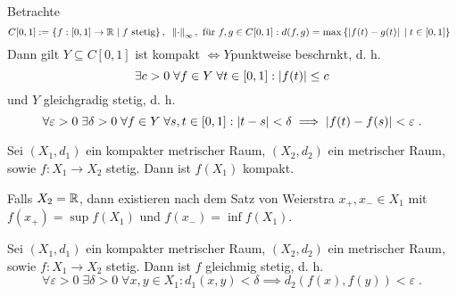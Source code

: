 	 \begin{ex}
	 	Betrachte 
	 	\[C[0,1] := \left\{f:[0,1] \to \mathbb{R} \;\vert\; f\text{ stetig}\right\}, \;\; \left\lVert\cdot\right\rVert_\infty , \text{ f{\"u}r } f, g \in C[0,1]: d(f,g) = \max \left\{\left\lvert f(t)- g(t) \right\rvert\;\vert\; t\in[0,1]\right\}\;\;\]
	 	Dann gilt $Y\subseteq C[0,1]$ ist kompakt $\iff Y$punktweise beschr\as nkt, d. h. 
	 	\[\exists c>0 \;\forall f \in Y \;\forall t \in [0,1]: \left\lvert f(t) \right\rvert \leq c\]
	 	und $Y$ gleichgradig stetig, d. h. 
	 	\[\forall \varepsilon > 0\; \exists \delta > 0 \;\forall f \in Y\;\forall s, t \in [0,1]: \left\lvert t-s \right\rvert < \delta \implies \left\lvert f(t) - f(s) \right\rvert < \varepsilon \;.\]
	 \end{ex} 
	 
	 \begin{theorem}
	 	Sei \((X_1, d_1)\) ein kompakter metrischer Raum, \((X_2, d_2)\) ein metrischer Raum, sowie \(f:X_1 \to X_2\) stetig. Dann ist \(f(X_1)\) kompakt.
	 \end{theorem}
	 \begin{rem}
	 	Falls $X_2 = \mathbb{R}$, dann existieren nach dem Satz von Weierstra\s{} \(x_+, x_- \in X_1\) mit \(f(x_+) = \sup f(X_1)\) und \(f(x_-) = \inf f(X_1)\).
	 \end{rem}
	 
	 \begin{theorem}
	 		Sei \((X_1, d_1)\) ein kompakter metrischer Raum, \((X_2, d_2)\) ein metrischer Raum, sowie \(f:X_1 \to X_2\) stetig. Dann ist $f$ gleichm\as \s ig stetig, d. h. 
	 		\[\forall \varepsilon > 0 \;\exists \delta > 0 \;\forall x,y \in X_1: d_1(x,y) < \delta \implies d_2(f(x), f(y)) < \varepsilon\;.\]
	 \end{theorem}
